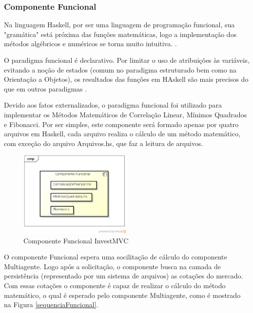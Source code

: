 \subsubsection{Componente Funcional}
Na linguagem Haskell, por ser uma linguagem de programação funcional, sua "gramática" está próxima das funções matemáticas, logo a implementação dos métodos algébricos e numéricos se torna muito intuitiva. \cite{hoogle2013}.

O paradigma funcional é declarativo. Por limitar o uso de atribuições às variáveis, evitando a noção de estados (comum no paradigma  estruturado bem como na Orientação a Objetos), os resultados das funções em HAskell são mais precisos do que em outros paradigmas \cite{piponi2006}.

Devido aos fatos externalizados, o paradigma funcional foi utilizado para implementar os Métodos Matemáticos de Correlação Linear, Mínimos Quadrados e Fibonacci. Por ser simples, este componente será formado apenas por quatro arquivos em Haskell, cada arquivo realiza o cálculo de um método matemático, com exceção do arquivo  Arquivos.hs, que faz a leitura de arquivos.

\begin{figure}[H]
\centering
\includegraphics[width=0.5\textwidth]{figuras/componenteFuncional}
\caption{Componente Funcional InvestMVC} 
\label{componenteFuncional}
\end{figure}

O componente Funcional espera uma socilitação de cálculo do componente Multiagente. Logo após a solicitação, o componente busca na camada de persistência (representado por um sistema de arquivos) as cotações do mercado. Com essas cotações o componente é capaz de realizar o cálculo do método matemático, o qual é esperado pelo componente Multiagente, como é mostrado na Figura \ref{sequenciaFuncional}.


